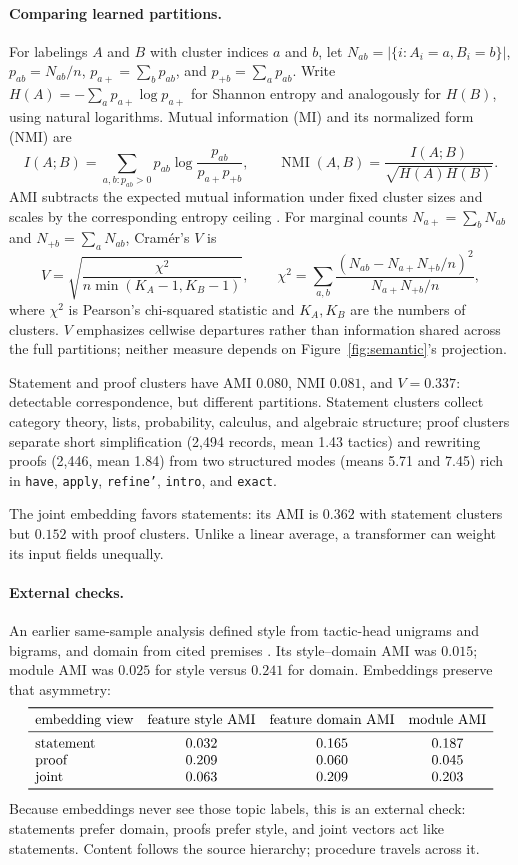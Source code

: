 \documentclass[11pt]{article}
\begin{document}
\paragraph{Comparing learned partitions.}
For labelings $A$ and $B$ with cluster indices $a$ and $b$, let
$N_{ab}=|\{i:A_i=a,B_i=b\}|$, $p_{ab}=N_{ab}/n$, $p_{a+}=\sum_b p_{ab}$, and
$p_{+b}=\sum_a p_{ab}$.  Write $H(A)=-\sum_a p_{a+}\log p_{a+}$ for Shannon entropy and analogously
for $H(B)$, using natural logarithms.  Mutual information (MI) and its normalized form (NMI) are
\[
 I(A;B)=\sum_{a,b:p_{ab}>0}p_{ab}\log\frac{p_{ab}}{p_{a+}p_{+b}},
 \qquad
 \operatorname{NMI}(A,B)=\frac{I(A;B)}{\sqrt{H(A)H(B)}}.
\]
AMI subtracts the expected mutual information under fixed cluster sizes and scales by the
corresponding entropy ceiling \cite{vinh}.  For marginal counts
$N_{a+}=\sum_bN_{ab}$ and $N_{+b}=\sum_aN_{ab}$, Cram\'er's $V$ is
\[
 V=\sqrt{\frac{\chi^2}{n\min(K_A-1,K_B-1)}},\qquad
 \chi^2=\sum_{a,b}\frac{(N_{ab}-N_{a+}N_{+b}/n)^2}{N_{a+}N_{+b}/n},
\]
where $\chi^2$ is Pearson's chi-squared statistic and $K_A,K_B$ are the numbers of clusters.
$V$ emphasizes cellwise departures rather than information shared across the full partitions;
neither measure depends on Figure~\ref{fig:semantic}'s projection.

Statement and proof clusters have AMI $0.080$, NMI $0.081$, and $V=0.337$: detectable
correspondence, but different partitions.  Statement clusters collect category theory, lists,
probability, calculus, and algebraic structure; proof clusters separate short simplification
(2,494 records, mean 1.43 tactics) and rewriting proofs (2,446, mean 1.84) from two structured
modes (means 5.71 and 7.45) rich in \texttt{have}, \texttt{apply}, \texttt{refine'}, \texttt{intro},
and \texttt{exact}.

The joint embedding favors statements: its AMI is $0.362$ with statement clusters but $0.152$ with
proof clusters.  Unlike a linear average, a transformer can weight its input fields unequally.

\paragraph{External checks.}
An earlier same-sample analysis defined style from tactic-head unigrams and bigrams, and domain
from cited premises \cite{textures}.  Its style--domain AMI was $0.015$; module AMI was $0.025$ for
style versus $0.241$ for domain.  Embeddings preserve that asymmetry:
\[
\begin{array}{lccc}
\toprule
\text{embedding view} & \text{feature style AMI} & \text{feature domain AMI} & \text{module AMI}\\
\midrule
\text{statement} & 0.032 & 0.165 & 0.187\\
\text{proof}     & 0.209 & 0.060 & 0.045\\
\text{joint}     & 0.063 & 0.209 & 0.203\\
\bottomrule
\end{array}
\]
Because embeddings never see those topic labels, this is an external check: statements prefer
domain, proofs prefer style, and joint vectors act like statements.  Content follows the source
hierarchy; procedure travels across it.
\end{document}
